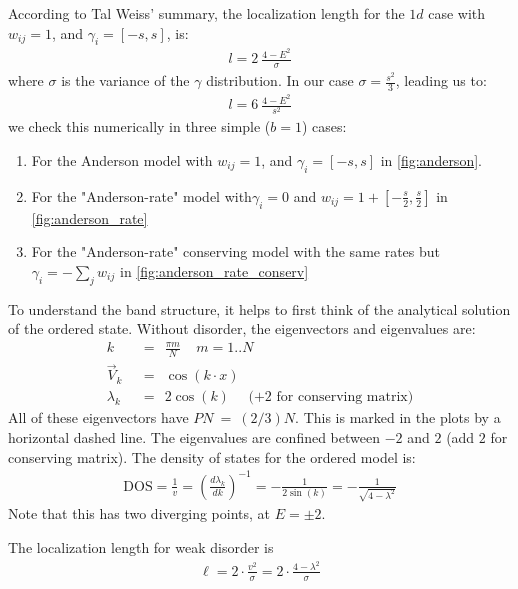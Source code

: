 \documentclass[onecolumn,fleqn]{revtex4}
\begin{document}
According to Tal Weiss' summary, the localization length
for the $1d$ case with $w_{ij}=1$, and $\gamma_i = [-s,s]$, is:
\begin{align}
 l = 2 \ \frac{4 - E^2}{\sigma} 
 \end{align}
where $\sigma$ is the variance of the $\gamma$ distribution. 
In our case $\sigma = \frac{s^2}{3}$, leading us to:
\begin{align}\label{eq:anderson_l}
 l = 6 \ \frac{4-E^2}{s^2} 
 \end{align}
we check this numerically in three simple ($b=1$) cases:
\begin{enumerate}
    \item{For the Anderson model with $w_{ij}=1$, and $\gamma_i = [-s,s]$ in \autoref{fig:anderson}.}
    \item{For the "Anderson-rate" model with$\gamma_i=0$ and $w_{ij}= 1 + \left[-\frac{s}{2}, \frac{s}{2} \right]$
            in \autoref{fig:anderson_rate}}
    \item{For the "Anderson-rate" conserving model with the same rates but $\gamma_i = -\sum_j w_{ij}$
            in \autoref{fig:anderson_rate_conserv}}
\end{enumerate}

To understand the band structure, it helps to first think of the analytical 
solution of the ordered state.
Without disorder, the eigenvectors and eigenvalues are:
\begin{align}
k\ \  &=\ \  \frac{\pi m}{N} \ \ \ \ \ m=1..N \\
\vec{V}_k\ \  &=\ \  \cos(k\cdot x)\\
\lambda_k\ \  &=\ \  2\cos(k) \ \ \ \ \ \ (+2 \textrm{  for conserving matrix)}
\end{align}  
All of these eigenvectors have $PN\ =\ (2/3)N$.
This is marked in the plots by a horizontal dashed line. 
The eigenvalues are confined between $-2$ and $2$  (add $2$ for conserving matrix).
The density of states for the ordered model is:
%
\begin{align}
\textrm{DOS} = \frac{1}{v} = \left(\frac{d\lambda_k}{dk}\right)^{-1} = -\frac{1}{2\sin(k)} = -\frac{1}{\sqrt{4-\lambda^2}}
\end{align}
Note that this has two diverging points, at $E=\pm 2$.


The localization length for weak disorder is 
\begin{align}
\ell = 2\cdot\frac{v^2}{\sigma}= 2\cdot\frac{4-\lambda^2}{\sigma}
\end{align}
\end{document}
